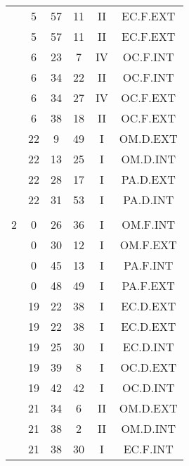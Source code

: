 \documentclass[12pt, a4paper]{article}
\begin{document}
\begin{multicols}{3}
{\begin{tabular}{c c c c c c}
	 	 	 	 & 5 & 57 & 11 & II & EC.F.EXT\\%
	 	 	 	 & 5 & 57 & 11 & II & EC.F.EXT\\%
	 	 	 	 & 6 & 23 & 7 & IV & OC.F.INT\\%
	 	 	 	 & 6 & 34 & 22 & II & OC.F.INT\\%
	 	 	 	 & 6 & 34 & 27 & IV & OC.F.EXT\\%
	 	 	 	 & 6 & 38 & 18 & II & OC.F.EXT\\%
	 	 	 	 & 22 & 9 & 49 & I & OM.D.EXT\\%
	 	 	 	 & 22 & 13 & 25 & I & OM.D.INT\\%
	 	 	 	 & 22 & 28 & 17 & I & PA.D.EXT\\%
	 	 	 	 & 22 & 31 & 53 & I & PA.D.INT\\%
	 	 	 	 & & & & & \\%
	 	 	 	2 & 0 & 26 & 36 & I & OM.F.INT\\%
	 	 	 	 & 0 & 30 & 12 & I & OM.F.EXT\\%
	 	 	 	 & 0 & 45 & 13 & I & PA.F.INT\\%
	 	 	 	 & 0 & 48 & 49 & I & PA.F.EXT\\%
	 	 	 	 & 19 & 22 & 38 & I & EC.D.EXT\\%
	 	 	 	 & 19 & 22 & 38 & I & EC.D.EXT\\%
	 	 	 	 & 19 & 25 & 30 & I & EC.D.INT\\%
	 	 	 	 & 19 & 39 & 8 & I & OC.D.EXT\\%
	 	 	 	 & 19 & 42 & 42 & I & OC.D.INT\\%
	 	 	 	 & 21 & 34 & 6 & II & OM.D.EXT\\%
	 	 	 	 & 21 & 38 & 2 & II & OM.D.INT\\%
	 	 	 	 & 21 & 38 & 30 & I & EC.F.INT\\%

\end{tabular}}
\end{multicols}
\end{document}
